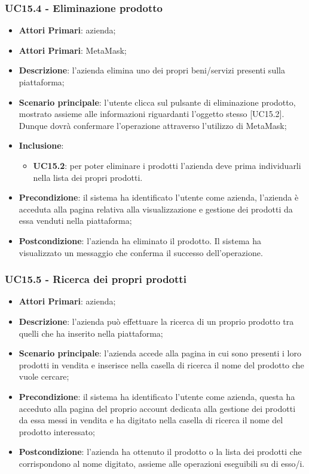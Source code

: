 \subsubsection{UC15.4 - Eliminazione prodotto}
\begin{itemize}
	\item \textbf{Attori Primari}: azienda;
	\item \textbf{Attori Primari}: MetaMask\glo;
	\item \textbf{Descrizione}:
	l'azienda elimina uno dei propri beni/servizi presenti sulla piattaforma;
	\item \textbf{Scenario principale}: l'utente clicca sul pulsante di eliminazione prodotto, mostrato assieme alle informazioni riguardanti l'oggetto stesso [UC15.2]. Dunque dovrà confermare l'operazione attraverso l'utilizzo di MetaMask\glo;
	\item \textbf{Inclusione}:
	\begin{itemize}
		\item \textbf{UC15.2}: per poter eliminare i prodotti l'azienda deve prima individuarli nella lista dei propri prodotti.
	\end{itemize}
	\item \textbf{Precondizione}: il sistema ha identificato l'utente come azienda, l'azienda è acceduta alla pagina relativa alla visualizzazione e gestione dei prodotti da essa venduti nella piattaforma;
	\item \textbf{Postcondizione}: l'azienda ha eliminato il prodotto. Il sistema ha visualizzato un messaggio che conferma il successo dell'operazione.
\end{itemize}

\subsubsection{UC15.5 - Ricerca dei propri prodotti}
\begin{itemize}
	\item \textbf{Attori Primari}: azienda;
	\item \textbf{Descrizione}:
	l'azienda può effettuare la ricerca di un proprio prodotto tra quelli che ha inserito nella piattaforma;
	\item \textbf{Scenario principale}: l'azienda accede alla pagina in cui sono presenti i loro prodotti in vendita e inserisce nella casella di ricerca il nome del prodotto che vuole cercare;
	\item \textbf{Precondizione}: il sistema ha identificato l'utente come azienda, questa ha acceduto alla pagina del proprio account dedicata alla gestione dei prodotti da essa messi in vendita e ha digitato nella casella di ricerca il nome del prodotto interessato;
	\item \textbf{Postcondizione}:
	 l'azienda ha ottenuto il prodotto o la lista dei prodotti che corrispondono al nome digitato, assieme alle operazioni eseguibili su di esso/i.
\end{itemize}


